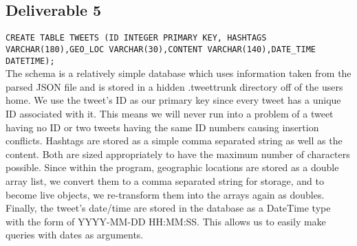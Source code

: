 \documentclass[a4paper, 12pt]{article}
\begin{document}
\subsection*{Deliverable 5} \label{sec:five}
\texttt{CREATE TABLE TWEETS (ID INTEGER PRIMARY KEY, HASHTAGS VARCHAR(180),GEO\_LOC VARCHAR(30),CONTENT VARCHAR(140),DATE\_TIME DATETIME);}
\\
The schema is a relatively simple database which uses information taken from the parsed JSON file and is stored in a hidden .tweettrunk directory off of the users home.  We use the tweet’s ID as our primary key since every tweet has a unique ID associated with it.  This means we will never run into a problem of a tweet having no ID or two tweets having the same ID numbers causing insertion conflicts.  Hashtags are stored as a simple comma separated string as well as the content.  Both are sized appropriately to have the maximum number of characters possible.  Since within the program, geographic locations are stored as a double array list, we convert them to a comma separated string for storage, and to become live objects, we re-transform them into the arrays again as doubles.  Finally, the tweet’s date/time are stored in the database as a DateTime type with the form of YYYY-MM-DD HH:MM:SS.  This allows us to easily make queries with dates as arguments. 
\end{document}
